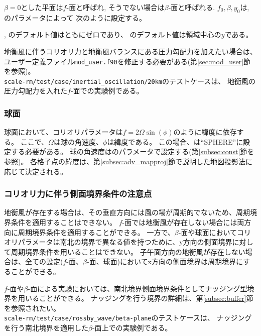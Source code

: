 $\beta=0$とした平面は$f$-面と呼ばれ, そうでない場合は$\beta$-面と呼ばれる.
$f_0, \beta, y_0$は, のパラメータによって
次のように設定する。

, のデフォルト値はともにゼロであり、
のデフォルト値は領域中心の$y$である。

地衡風に伴うコリオリ力と地衡風バランスにある圧力勾配力を加えたい場合は、
ユーザー定義ファイル\verb|mod_user.f90|を修正する必要がある(第\ref{sec:mod_user}節を参照)。\\
\verb|scale-rm/test/case/inertial_oscillation/20km|のテストケースは、
地衡風の圧力勾配力を入れた$f$-面での実験例である。

\subsubsection{球面}
球面において、コリオリパラメータは$f = 2\Omega \sin(\phi)$のように緯度に依存する。
ここで、$\Omega$は球の角速度、$\phi$は緯度である。
この場合、は``SPHERE''に設定する必要がある。
球の角速度はのパラメータで設定する(第\ref{subsec:const}節を参照)。
各格子点の緯度は、第\ref{subsec:adv_mapproj}節で説明した地図投影法に応じて決定される。


\subsubsection{コリオリ力に伴う側面境界条件の注意点}

地衡風が存在する場合は、その垂直方向には風の場が周期的でないため、周期境界条件を適用することはできない。
$f$-面では地衡風が存在しない場合には両方向に周期境界条件を適用することができる。
一方で、$\beta$-面や球面においてコリオリパラメータは南北の境界で異なる値を持つために、y方向の側面境界に対して周期境界条件を用いることはできない。
子午面方向の地衡風が存在しない場合は、全ての設定($f$-面、$\beta$-面、球面)においてx方向の側面境界は周期境界にすることができる。

$f$-面や$\beta$-面による実験においては、南北境界側面境界条件としてナッジング型境界を用いることができる。
ナッジングを行う境界の詳細は、第\ref{subsec:buffer}節を参照されたい。\\
\verb|scale-rm/test/case/rossby_wave/beta-plane|のテストケースは、
ナッジングを行う南北境界を適用した$\beta$-面上での実験例である。



